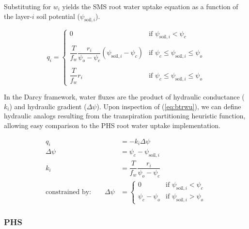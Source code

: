 \documentclass[draft,linenumbers]{agujournal}
\begin{document}
    Substituting for $w_i$ yields the SMS root water uptake equation as a function of the layer-$i$ soil potential ($\psi_{\text{soil},i}$).
    
    \begin{linenomath*}
    \begin{equation}
    q_i =
    \begin{cases}
    \label{eq:btrwu}
    0    & \text{if } \psi_{\text{soil},i}<\psi_{c}  \\
    \\[1pt]
        \dfrac{T}{f_w} \dfrac{r_i}{\psi_{o}-\psi_{c}} \left(\psi_{\text{soil},i}-\psi_{c} \right)     & \text{if } \psi_{c} \le \psi_{\text{soil},i} \le \psi_{o} \\
    \\[1pt]
    \dfrac{T}{f_w} r_i    & \text{if } \psi_{c} \le \psi_{\text{soil},i} \le \psi_{o}
    \end{cases}
    \end{equation}
    \end{linenomath*}
    
    In the Darcy framework, water fluxes are the product of hydraulic conductance ($k_i$) and hydraulic gradient ($\Delta\psi$).
    Upon inspection of (\ref{eq:btrwu}), we can define hydraulic analogs resulting from the transpiration partitioning heuristic function, 
    allowing easy comparison to the PHS root water uptake implementation.
    
    \begin{linenomath*}
    \begin{equation} \begin{aligned}
    q_i &= -k_i\Delta\psi \\
    \Delta\psi &=  \psi_{c}-\psi_{\text{soil},i} \\
    k_i &= \dfrac{T}{f_w} \dfrac{r_i}{\psi_{o}-\psi_{c}} \\
    \mbox{constrained by:} \qquad
    \Delta\psi &=
    \begin{cases}
    0                          & \text{if } \psi_{\text{soil},i}<\psi_{c}  \\
    \psi_{c}-\psi_{o} & \text{if } \psi_{\text{soil},i}>\psi_{o}
    \label{kb}
    \end{cases}
    \end{aligned}\end{equation}
    \end{linenomath*}
    
    
    \subsubsection{PHS}
    
\end{document}
